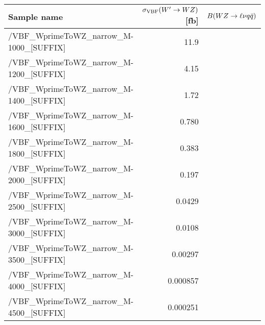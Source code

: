 \scriptsize
\begin{tabular}{lrr}
  \hline
  \textbf{Sample name} & $\sigma_{\mathrm{VBF}}(W'\to WZ)$ [fb] & $B(WZ\to\ell\nu q\bar{q})$ \\
  \hline
  \ttfamily /VBF\_WprimeToWZ\_narrow\_M-1000\_[SUFFIX] & 11.9  \\
  \ttfamily /VBF\_WprimeToWZ\_narrow\_M-1200\_[SUFFIX] & 4.15  \\
  \ttfamily /VBF\_WprimeToWZ\_narrow\_M-1400\_[SUFFIX] & 1.72  \\
  \ttfamily /VBF\_WprimeToWZ\_narrow\_M-1600\_[SUFFIX] & 0.780  \\
  \ttfamily /VBF\_WprimeToWZ\_narrow\_M-1800\_[SUFFIX] & 0.383  \\
  \ttfamily /VBF\_WprimeToWZ\_narrow\_M-2000\_[SUFFIX] & 0.197  \\
  \ttfamily /VBF\_WprimeToWZ\_narrow\_M-2500\_[SUFFIX] & 0.0429  \\
  \ttfamily /VBF\_WprimeToWZ\_narrow\_M-3000\_[SUFFIX] & 0.0108  \\
  \ttfamily /VBF\_WprimeToWZ\_narrow\_M-3500\_[SUFFIX] & 0.00297  \\
  \ttfamily /VBF\_WprimeToWZ\_narrow\_M-4000\_[SUFFIX] & 0.000857  \\
  \ttfamily /VBF\_WprimeToWZ\_narrow\_M-4500\_[SUFFIX] & 0.000251  \\
  \hline
\end{tabular}
